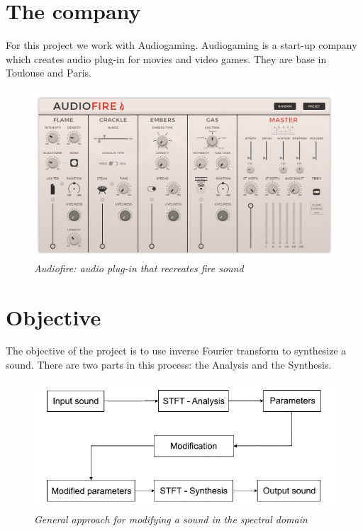 \documentclass[]{article}
\begin{document}
\section{The company}\label{sec:the-company}
\hspace{15pt}For this project we work with Audiogaming. Audiogaming is a start-up company which creates audio
plug-in for movies and video games. They are base in Toulouse and Paris.
\begin{figure}[H]
	\centering
	\includegraphics[scale=0.19]{AudioFire_screen.png}
	\caption{\it Audiofire: audio plug-in that recreates fire sound}
\end{figure}

\section{Objective}\label{sec:objective}

\hspace{15pt}The objective of the project is to use
inverse Fourier transform to synthesize a sound. There are two
parts in this process: the Analysis and the Synthesis.
	\begin{figure}[H]
		\centering
		\includegraphics[scale=0.4]{Analysis_Synthesis.png}
		\caption{\it General approach for modifying a sound in the spectral domain}
	\end{figure}
\end{document}
